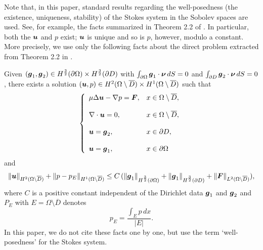 Note that, in this paper, standard results regarding the well-posedness
(the existence, uniqueness, stability) of the Stokes system in the Sobolev spaces are used.
See, for example, the facts  summarized in Theorem 2.2 of \cite{BA}.  In particular, both the $\mbox{\boldmath $u$}$ and $p$ exist;
$\mbox{\boldmath $u$}$ is unique and so is $p$, however, modulo a constant.
More precisely, we use only the following facts about the direct problem extracted from Theorem 2.2 in \cite{BA}.

Given $(\mbox{\boldmath $g$}_1,\mbox{\boldmath $g$}_2)\in H^{\frac{3}{2}}(\partial\Omega)\times
H^{\frac{3}{2}}(\partial D)$ with $\int_{\partial\Omega}\mbox{\boldmath $g$}_1\cdot\mbox{\boldmath $\nu$}\,dS=0$
and $\int_{\partial D}\mbox{\boldmath $g$}_2\cdot\mbox{\boldmath $\nu$}\,dS=0$,
there exists a solution $(\mbox{\boldmath $u$},p)\in H^{2}(\Omega\setminus\overline{D})
\times H^1(\Omega\setminus\overline{D})$ such that
$$\left\{
 \begin{array}{ll}
 \mu\Delta\mbox{\boldmath $u$}-\nabla p=\mbox{\boldmath $F$}, & x\in\Omega\setminus\overline{D},
 \\
 \\
 \displaystyle
 \nabla\cdot\mbox{\boldmath $u$}=0, &  x\in\Omega\setminus\overline{D},\\
 \\
 \displaystyle
 \mbox{\boldmath $u$}=\mbox{\boldmath $g$}_2, & x\in\partial D,
 \\
 \\
 \displaystyle
 \mbox{\boldmath $u$}=\mbox{\boldmath $g$}_1, & x\in\partial\Omega
 \end{array}
 \right.
 $$
 and
 $$\displaystyle
 \Vert\mbox{\boldmath $u$}\Vert_{H^2(\Omega\setminus\overline{D})}
 +\Vert p-p_{E}\Vert_{H^1(\Omega\setminus\overline{D})}
 \le C\,(\Vert\mbox{\boldmath $g$}_1\Vert_{H^{\frac{3}{2}}(\partial\Omega)}+
 \Vert\mbox{\boldmath $g$}_1\Vert_{H^{\frac{3}{2}}(\partial D)}+\Vert\mbox{\boldmath $F$}\Vert_{L^2(\Omega\setminus\overline{D})}),
 $$
 where $C$ is a positive constant independent of the Dirichlet data $\mbox{\boldmath $g$}_1$ and $\mbox{\boldmath $g$}_2$ and $P_{E}$ with $E=\Omega\setminus\overline{D}$ denotes
 $$\displaystyle
 p_{E}=\frac{\int_{E} p\,dx}{\vert E\vert}.
 $$
 In this paper, we do not cite these facts one by one, but use the term `well-posedness' for the Stokes system.

 
 
 

 
 $\quad$
 
 
 
